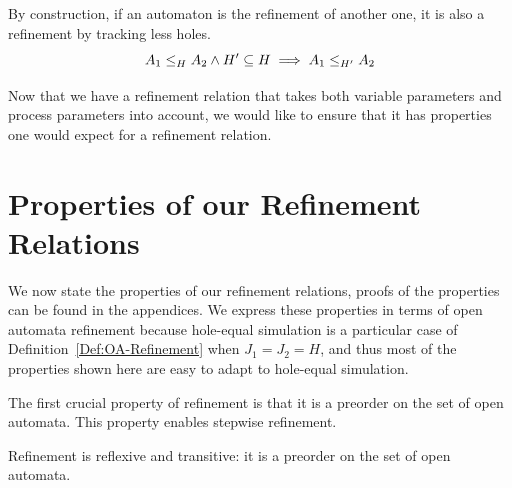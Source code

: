 \documentclass[runningheads]{llncs}
\newcommand{\xrightarrowdbl}[2][]{%
  \xrightarrow[#1]{#2}\mathrel{\mkern-14mu}\rightarrow
}
\begin{document}
%
%

\begin{lemma} By construction, if an automaton is the refinement of another one, it is also a refinement by tracking less holes.
\[\wrel{A_1}{A_2}{H} \land H'\subseteq H \implies \wrel{A_1}{A_2}{H'}\]
\end{lemma}

Now that we have a refinement relation that takes both variable parameters and process parameters into account, we would like to ensure that it has  properties one would expect for a refinement relation.

\section{Properties of our Refinement Relations}\label{sec:prop}

We now  state the properties of our refinement relations, proofs of the properties can be found in the appendices. We express these properties in terms of open automata refinement because hole-equal simulation is a particular case of Definition~\ref{Def:OA-Refinement} when  $J_1=J_2=H$, and thus most of the properties shown here are easy to adapt to hole-equal simulation.

The first crucial property of  refinement  is that it is  a  preorder on the set of open automata. This property enables stepwise refinement.


\begin{theorem}
Refinement   is reflexive  and  transitive:  it  is  a  preorder on the set of open automata.
\end{theorem}
\end{document}
